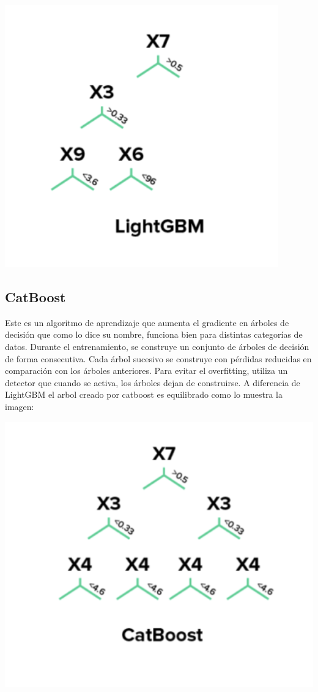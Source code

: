 \documentclass[12pt,a4paper]{article}
\begin{document}
\begin{center}
    \includegraphics[scale=0.5]{imgs/lightgbm.png}
\end{center}

\subsection{CatBoost}
Este es un algoritmo de aprendizaje que aumenta el gradiente en árboles de decisión que como lo dice su nombre, funciona bien para distintas categorías de datos.
Durante el entrenamiento, se construye un conjunto de árboles de decisión de forma consecutiva. Cada árbol sucesivo se construye con pérdidas reducidas en comparación con los árboles anteriores.
Para evitar el overfitting, utiliza un detector que cuando se activa, los árboles dejan de construirse.
A diferencia de LightGBM el arbol creado por catboost es equilibrado como lo muestra la imagen:

\begin{center}
    \includegraphics[scale=0.5]{imgs/catboost.png}
\end{center}
\end{document}
